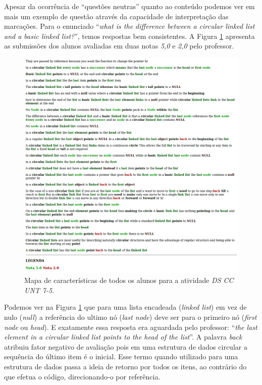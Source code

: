 Apesar da ocorrência de ``questões neutras'' quanto ao conteúdo podemos ver em mais um exemplo de questão através da capacidade de interpretação das marcações. Para o enunciado ``\textit{what is the difference between a circular linked list and a basic linked list?}'', temos respostas bem consistentes. A Figura \ref{UNT-75} apresenta as submissões dos alunos avaliadas em duas notas \textit{5,0} e \textit{2,0} pelo professor.


\begin{figure}[h!]
\centering
\includegraphics[width=\textwidth]{img/UNT-7-5.png}
\caption{Mapa de características de todos os alunos para a atividade \textit{DS CC UNT 7-5}.}
\label{UNT-75}
\end{figure}

Podemos ver na Figura \ref{UNT-75} que para uma lista encadeada (\textit{linked list}) em vez de nulo (\textit{null}) a referência do ultimo nó (\textit{last node}) deve ser para o primeiro nó (\textit{first node} ou \textit{head}). E exatamente essa resposta era aguardada pelo professor: ``\textit{the last element in a circular linked list points to the head of the list}''. A palavra \textit{back} atribuiu fator negativo de avaliação pois em uma estrutura de dados circular a sequência do último item é o inicial. Esse termo quando utilizado para uma estrutura de dados passa a ideia de retorno por todos os itens, ao contrário do que efetua o código, direcionando-o por referência.

